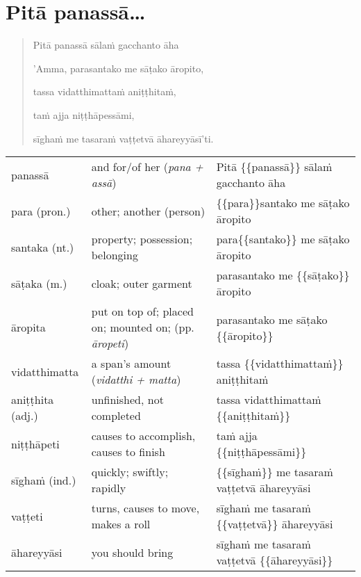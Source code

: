 \documentclass[11pt,oneside]{memoir}
\begin{document}

\clearpage

\section{Pitā panassā\ldots{}}
\label{sec:org6d2ff24}

\vspace*{-\baselineskip}

\begin{quote}
Pitā panassā sālaṁ gacchanto āha

'Amma, parasantako me sāṭako āropito,

tassa vidatthimattaṁ aniṭṭhitaṁ,

taṁ ajja niṭṭhāpessāmi,

sīghaṁ me tasaraṁ vaṭṭetvā āhareyyāsī'ti.
\end{quote}

\begin{longtable}{L{\colOne} L{\colTwo} H}
panassā & and for/of her (\emph{pana + assā}) & Pitā \{\{panassā\}\} sālaṁ gacchanto āha\\[0pt]
para (pron.) & other; another (person) & \{\{para\}\}santako me sāṭako āropito\\[0pt]
santaka (nt.) & property; possession; belonging & para\{\{santako\}\} me sāṭako āropito\\[0pt]
sāṭaka (m.) & cloak; outer garment & parasantako me \{\{sāṭako\}\} āropito\\[0pt]
āropita & put on top of; placed on; mounted on; (pp. \emph{āropeti}) & parasantako me sāṭako \{\{āropito\}\}\\[0pt]
vidatthimatta & a span's amount  (\emph{vidatthi + matta}) & tassa \{\{vidatthimattaṁ\}\} aniṭṭhitaṁ\\[0pt]
aniṭṭhita (adj.) & unfinished, not completed & tassa vidatthimattaṁ \{\{aniṭṭhitaṁ\}\}\\[0pt]
niṭṭhāpeti & causes to accomplish, causes to finish & taṁ ajja \{\{niṭṭhāpessāmi\}\}\\[0pt]
sīghaṁ (ind.) & quickly; swiftly; rapidly & \{\{sīghaṁ\}\} me tasaraṁ vaṭṭetvā āhareyyāsi\\[0pt]
vaṭṭeti & turns, causes to move, makes a roll & sīghaṁ me tasaraṁ \{\{vaṭṭetvā\}\} āhareyyāsi\\[0pt]
āhareyyāsi & you should bring & sīghaṁ me tasaraṁ vaṭṭetvā \{\{āhareyyāsi\}\}\\[0pt]
\end{longtable}
\end{document}
